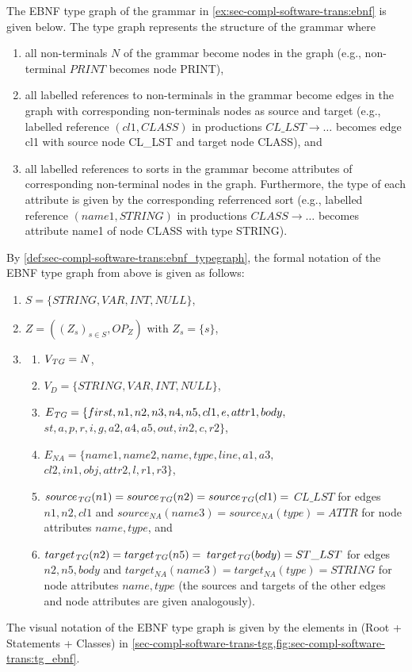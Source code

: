 \begin{example}
\label{ex:sec-compl-software-trans-mapping:ebnf_tg}
The EBNF type graph of the grammar in \cref{ex:sec-compl-software-trans:ebnf} is given below.
The type graph represents the structure of the grammar where
\begin{enumerate}
  \item all non-terminals $N$ of the grammar become nodes in the graph (e.g., non-terminal $PRINT$ becomes node \textsf{PRINT}),
  \item all labelled references to non-terminals in the grammar become edges in the graph with corresponding non-terminals nodes as source and target (e.g., labelled reference $(cl1,CLASS)$ in productions $CL\_LST\to \ldots$ becomes edge \textsf{cl1} with source node \textsf{CL\_LST} and target node \textsf{CLASS}), and
  \item all labelled references to sorts in the grammar become attributes of corresponding non-terminal nodes in the graph.
  Furthermore, the type of each attribute is given by the corresponding referrenced sort (e.g., labelled reference $(name1,STRING)$ in productions $CLASS \to \ldots$ becomes attribute \textsf{name1} of node \textsf{CLASS} with type \textsf{STRING}).
\end{enumerate}
By \cref{def:sec-compl-software-trans:ebnf_typegraph}, the formal notation of the EBNF type graph from above is given as follows:
\begin{enumerate}
  \item $S=\{STRING,VAR,INT,NULL\}$,
  \item $Z=((Z_s)_{s \in S},OP_Z)$ with $Z_s=\{s\}$,
  \item \begin{enumerate}
    \item $V_\mathit{TG}=N$,
    \item $V_D=\{STRING,VAR,INT,NULL\}$,
    \item $E_\mathit{TG}=\{first,n1,n2,n3,n4,n5,cl1,e,attr1,body,$ $st,a,p,r,i,g,a2,a4,a5,out,in2,c,r2\}$,
    \item $E_{NA}=\{name1,name2,name,type,line,a1,a3,$ $cl2,in1,obj,attr2,l,r1,r3\}$,
    \item $source_\mathit{TG}(n1)=source_\mathit{TG}(n2)=source_\mathit{TG}(cl1)=$ $CL\_LST$ for edges $n1,n2,cl1$ and $source_{NA}(name3)=source_{NA}(type)=ATTR$ for node attributes $name,type$, and
    \item $target_\mathit{TG}(n2)=target_\mathit{TG}(n5)=$ $target_\mathit{TG}(body)=ST\_LST$ for edges $n2,n5,body$ and $target_{NA}(name3)=target_{NA}(type)=STRING$ for node attributes $name,type$ (the sources and targets of the other edges and node attributes are given analogously).\envEndMarker
  \end{enumerate}
\end{enumerate}
The visual notation of the EBNF type graph is given by the elements in (Root + Statements + Classes) in \cref{sec-compl-software-trans-tgg,fig:sec-compl-software-trans:tg_ebnf}.
\end{example}


